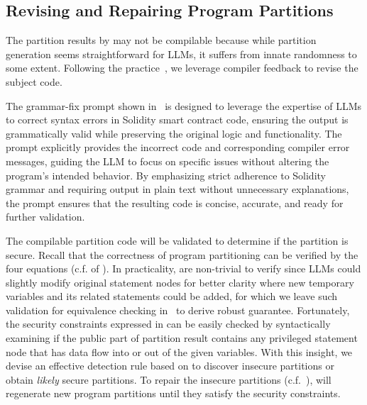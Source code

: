 \subsection{Revising and Repairing Program Partitions}
The partition results by \tool may not be compilable because while partition generation seems straightforward for LLMs, it suffers from innate randomness to some extent. 
Following the practice~\cite{grubisic2024compiler}, we leverage compiler feedback to revise the subject code.   

The grammar-fix prompt shown in~ is designed to leverage the expertise of LLMs to correct syntax errors in Solidity smart contract code, ensuring the output is grammatically valid while preserving the original logic and functionality. The prompt explicitly provides the incorrect code and corresponding compiler error messages, guiding the LLM to focus on specific issues without altering the program's intended behavior. By emphasizing strict adherence to Solidity grammar and requiring output in plain text without unnecessary explanations, the prompt ensures that the resulting code is concise, accurate, and ready for further validation.

The compilable partition code will be validated to determine if the partition is secure.
Recall that the correctness of program partitioning can be verified by the four equations (c.f.  of ).
In practicality,  are non-trivial to verify since LLMs could slightly modify original statement nodes for better clarity
where new temporary variables and its related statements could be added, for which we leave such validation for equivalence checking in~ to derive robust guarantee.
Fortunately, the security constraints expressed in  can be easily checked by syntactically examining if the public part of partition result contains any privileged statement node that has data flow into or out of the given \secrete variables.
With this insight, we devise an effective detection rule based on  to discover insecure partitions or obtain \emph{likely} secure partitions.
To repair the insecure partitions (c.f.~), \tool will regenerate new program partitions until they satisfy the security constraints.   

